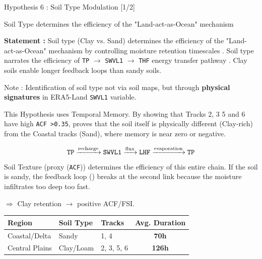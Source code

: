 \documentclass[8pt, aspectratio=169]{beamer}
\begin{document}
\begin{frame}{Hypothesis 6 : Soil Type Modulation [1/2]}
    \begin{block}{Soil Type determines the efficiency of the "Land-act-as-Ocean" mechanism}\end{block}

    \footnotesize
    \textbf{Statement :} Soil type (Clay vs. Sand) determines the efficiency of the "Land-act-as-Ocean" mechanism by controlling moisture retention timescales \cite{seneviratne2010investigating}. Soil type narrates the efficiency of \texttt{TP} $\rightarrow$ \texttt{SWVL1} $\rightarrow$ \texttt{THF} energy transfer pathway \cite{hunt2017effect}. Clay soils enable longer feedback loops than sandy soils.

    \vspace{0.1cm}
    \begin{block}{\footnotesize Note :}
        Identification of soil type not via soil maps, but through \textbf{physical signatures} in ERA5-Land \texttt{SWVL1} variable.
    \end{block}

    \vspace{0.15cm}
    \footnotesize
    This Hypothesis uses Temporal Memory. By showing that Tracks 2, 3 5 and 6 have high \texttt{ACF >0.35}, proves that the soil itself is physically different (Clay-rich) from the Coastal tracks (Sand), where memory is near zero or negative.

    \begin{equation}
        \text{\texttt{TP}} \xrightarrow{\text{recharge}} \text{\texttt{SWVL1}} \xrightarrow{\text{flux}} \text{\texttt{LHF}} \xrightarrow{\text{evaporation}} \text{\texttt{TP}}
    \end{equation}
    Soil Texture (proxy (\texttt{ACF})) determines the efficiency of this entire chain. If the soil is sandy, the feedback loop (\cite{hunt2017effect}) breaks at the second link because the moisture infiltrates too deep too fast.

    \vspace{0.15cm}
    \footnotesize
    $\Rightarrow$ Clay retention $\rightarrow$ positive ACF/FSI.

    \vspace{0.15cm}
    \footnotesize
        \begin{center}
            \begin{tabular}{lllc}
                \toprule
                \textbf{Region} & \textbf{Soil Type} & \textbf{Tracks} & \textbf{Avg. Duration} \\
                \midrule
                Coastal/Delta   & Sandy              & 1, 4            & \textbf{70h}           \\
                Central Plains  & Clay/Loam          & 2, 3, 5, 6      & \textbf{126h}          \\
                \bottomrule
            \end{tabular}
        \end{center}


\end{frame}
\end{document}
